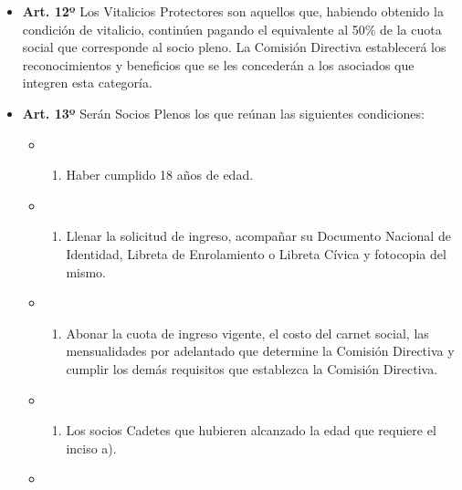 \documentclass[]{book}
\providecommand{\tightlist}{%
  \setlength{\itemsep}{0pt}\setlength{\parskip}{0pt}}
\begin{document}
\begin{itemize}
\tightlist
\item
  \textbf{Art. 12º} Los Vitalicios Protectores son aquellos que,
  habiendo obtenido la condición de vitalicio, continúen pagando el
  equivalente al 50\% de la cuota social que corresponde al socio pleno.
  La Comisión Directiva establecerá los reconocimientos y beneficios que
  se les concederán a los asociados que integren esta categoría.
\end{itemize}

\begin{itemize}
\item
  \textbf{Art. 13º} Serán Socios Plenos los que reúnan las siguientes
  condiciones:

  \begin{itemize}
  \item
    \begin{enumerate}
    \def\labelenumi{\alph{enumi})}
    \tightlist
    \item
      Haber cumplido 18 años de edad.
    \end{enumerate}
  \item
    \begin{enumerate}
    \def\labelenumi{\alph{enumi})}
    \setcounter{enumi}{1}
    \tightlist
    \item
      Llenar la solicitud de ingreso, acompañar su Documento Nacional de
      Identidad, Libreta de Enrolamiento o Libreta Cívica y fotocopia
      del mismo.
    \end{enumerate}
  \item
    \begin{enumerate}
    \def\labelenumi{\alph{enumi})}
    \setcounter{enumi}{2}
    \tightlist
    \item
      Abonar la cuota de ingreso vigente, el costo del carnet social,
      las mensualidades por adelantado que determine la Comisión
      Directiva y cumplir los demás requisitos que establezca la
      Comisión Directiva.
    \end{enumerate}
  \item
    \begin{enumerate}
    \def\labelenumi{\alph{enumi})}
    \setcounter{enumi}{3}
    \tightlist
    \item
      Los socios Cadetes que hubieren alcanzado la edad que requiere el
      inciso a).
    \end{enumerate}
  \item
    \begin{enumerate}

\end{enumerate}
\end{itemize}
\end{itemize}
\end{document}
